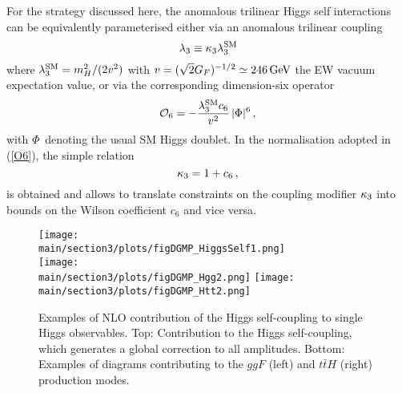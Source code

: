 For the strategy discussed here, the anomalous trilinear Higgs self interactions can be equivalently parameterised either via an anomalous trilinear coupling  
\begin{equation}
\lambda_{3} \equiv \kappa_{3} \lambda_{3}^{\rm SM}
\end{equation}
where $\lambda_3^{\rm SM} = m_H^2/(2 v^2)$ with $v = (\sqrt{2} G_F)^{-1/2} \simeq 246 \, {\rm GeV}$ the EW vacuum expectation value, or via the corresponding dimension-six operator 
\begin{equation} \label{O6}
{\cal O}_6 = - \frac{\lambda_3^{\rm SM} c_6}{v^2} \, |\Phi|^6  \,,
\end{equation}
with $\Phi$~denoting the usual SM Higgs doublet. In the normalisation adopted in (\ref{O6}), the simple relation 
\begin{equation}
\kappa_{3} = 1 + c_6 \,,
\end{equation}
is obtained and allows to translate constraints on the coupling modifier $\kappa_{3}$ into bounds on the Wilson coefficient $c_6$ and vice versa. 

\begin{figure}
	\centering
	\texttt{[image: \\main/section3/plots/figDGMP\_HiggsSelf1.png]}\\
	\texttt{[image: \\main/section3/plots/figDGMP\_Hgg2.png]}
	\texttt{[image: \\main/section3/plots/figDGMP\_Htt2.png]}
	\caption{Examples of NLO contribution of the Higgs self-coupling to single Higgs observables. Top: Contribution to the Higgs self-coupling, which generates a global correction to all amplitudes. Bottom: Examples of diagrams contributing to the $ggF$ (left) and $t\bar{t}H$ (right) production modes.}
	\label{fig:singlehdiagrams}
\end{figure}

